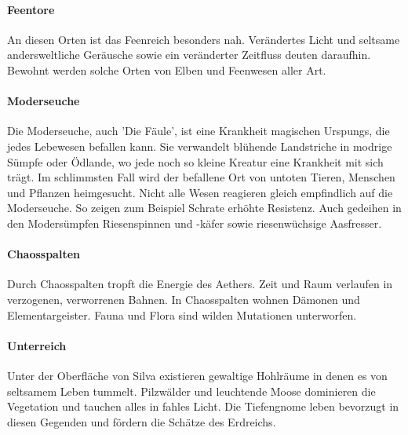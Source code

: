 \documentclass[10pt,twoside,twocolumn,openany]{book}
\begin{document}
\begin{multicols}{2}
	\paragraph{Feentore}
	An diesen Orten ist das Feenreich besonders nah. Verändertes Licht und seltsame andersweltliche Geräusche sowie ein veränderter Zeitfluss deuten daraufhin. Bewohnt werden solche Orten von Elben und Feenwesen aller Art.
	
	\paragraph{Moderseuche}
	Die Moderseuche, auch 'Die Fäule', ist eine Krankheit magischen Urspungs, die jedes Lebewesen befallen kann. Sie verwandelt blühende Landstriche in modrige Sümpfe oder Ödlande, wo jede noch so kleine Kreatur eine Krankheit mit sich trägt. Im schlimmsten Fall wird der befallene Ort von untoten Tieren, Menschen und Pflanzen heimgesucht. 
	Nicht alle Wesen reagieren gleich empfindlich auf die Moderseuche. So zeigen zum Beispiel Schrate erhöhte Resistenz. Auch gedeihen in den Modersümpfen Riesenspinnen und -käfer sowie riesenwüchsige Aasfresser.
	
	\paragraph{Chaosspalten}
	Durch Chaosspalten tropft die Energie des Aethers. Zeit und Raum verlaufen in verzogenen, verworrenen Bahnen. In Chaosspalten wohnen Dämonen und Elementargeister. Fauna und Flora sind wilden Mutationen unterworfen.
	
	\paragraph{Unterreich}
	Unter der Oberfläche von Silva existieren gewaltige Hohlräume in denen es von seltsamem Leben tummelt. Pilzwälder und leuchtende Moose dominieren die Vegetation und tauchen alles in fahles Licht. Die Tiefengnome leben bevorzugt in diesen Gegenden und fördern die Schätze des Erdreichs.
\end{multicols}
\end{document}
